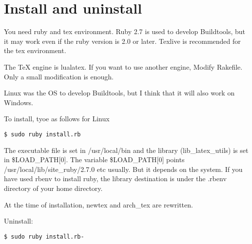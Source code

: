 \section{Install and uninstall}

You need ruby and tex environment. Ruby 2.7 is
used to develop Buildtools, but it may work even if the ruby version is
2.0 or later. Texlive is recommended for the tex
environment.

The TeX engine is lualatex. If you want to use another engine, Modify
Rakefile. Only a small modification is enough.

Linux was the OS to develop Buildtools, but I think that it will also
work on Windows.

To install, tyoe as follows for Linux

\begin{verbatim}
$ sudo ruby ​​install.rb
\end{verbatim}

The executable file is set in /usr/local/bin and the library
(lib\_latex\_utils) is set in \$LOAD\_PATH{[}0{]}. The variable
\$LOAD\_PATH{[}0{]} points /usr/local/lib/site\_ruby/2.7.0 etc usually.
But it depends on the system. If you have used rbenv to install ruby,
the library destination is under the .rbenv directory of your home
directory.

At the time of installation, newtex and arch\_tex are rewritten.

Uninstall:

\begin{verbatim}
$ sudo ruby ​​install.rb-
\end{verbatim}
